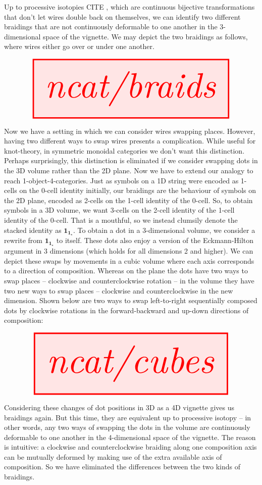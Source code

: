 Up to processive isotopies \bR CITE \e, which are continuous bijective transformations that don't let wires double back on themselves, we can identify two different braidings that are not continuously deformable to one another in the 3-dimensional space of the vignette. We may depict the two braidings as follows, where wires either go over or under one another.

\[\resizebox{\textwidth}{!}{\tikzfig{ncat/braids}}\]

Now we have a setting in which we can consider wires swapping places. However, having two different ways to swap wires presents a complication. While useful for knot-theory, in symmetric monoidal categories we don't want this distinction. Perhaps surprisingly, this distinction is eliminated if we consider swapping dots in the 3D volume rather than the 2D plane. Now we have to extend our analogy to reach 1-object-4-categories. Just as symbols on a 1D string were encoded as 1-cells on the 0-cell identity initially, our braidings are the behaviour of symbols on the 2D plane, encoded as 2-cells on the 1-cell identity of the 0-cell. So, to obtain symbols in a 3D volume, we want 3-cells on the 2-cell identity of the 1-cell identity of the 0-cell. That is a mouthful, so we instead clumsily denote the stacked identity as $\textbf{1}_{\textbf{1}_\star}$. To obtain a dot in a 3-dimensional volume, we consider a rewrite from $\textbf{1}_{\textbf{1}_\star}$ to itself. These dots also enjoy a version of the Eckmann-Hilton argument in 3 dimensions (which holds for all dimensions 2 and higher). We can depict these swaps by movements in a cubic volume where each axis corresponds to a direction of composition. Whereas on the plane the dots have two ways to swap places -- clockwise and counterclockwise rotation -- in the volume they have two new ways to swap places -- clockwise and counterclockwise in the new dimension. Shown below are two ways to swap left-to-right sequentially composed dots by clockwise rotations in the forward-backward and up-down directions of composition:

\[\resizebox{\textwidth}{!}{\tikzfig{ncat/cubes}}\]

Considering these changes of dot positions in 3D as a 4D vignette gives us braidings again. But this time, they are equivalent up to processive isotopy -- in other words, any two ways of swapping the dots in the volume are continuously deformable to one another in the 4-dimensional space of the vignette. The reason is intuitive: a clockwise and counterclockwise braiding along one composition axis can be mutually deformed by making use of the extra available axis of composition. So we have eliminated the differences between the two kinds of braidings.\\

